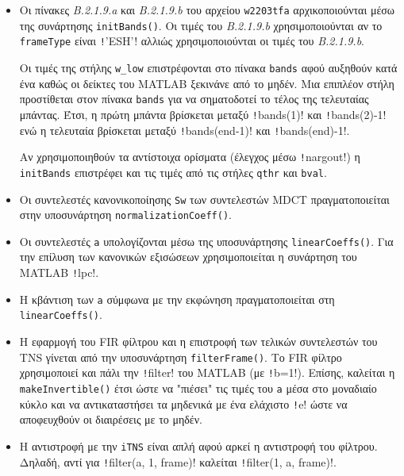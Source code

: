 \begin{itemize}
\item\label{initBands} Οι πίνακες \textit{B.2.1.9.a} και \textit{B.2.1.9.b} του αρχείου \texttt{w2203tfa} αρχικοποιούνται μέσω της συνάρτησης \texttt{initBands()}.
Οι τιμές του \textit{B.2.1.9.b} χρησιμοποιούνται αν το \texttt{frameType} είναι \texttt!'ESH'! αλλιώς χρησιμοποιούνται οι τιμές του \textit{B.2.1.9.b}.

Οι τιμές της στήλης \texttt{w\_low} επιστρέφονται στο πίνακα \texttt{bands} αφού αυξηθούν κατά ένα καθώς οι δείκτες του MATLAB ξεκινάνε από το μηδέν.
Μια επιπλέον στήλη προστίθεται στον πίνακα \texttt{bands} για να σηματοδοτεί το τέλος της τελευταίας μπάντας.
Έτσι, η πρώτη μπάντα βρίσκεται μεταξύ \texttt!bands(1)! και \texttt!bands(2)-1! ενώ η τελευταία βρίσκεται μεταξύ \texttt!bands(end-1)! και \texttt!bands(end)-1!.

Αν χρησιμοποιηθούν τα αντίστοιχα ορίσματα (έλεγχος μέσω \texttt!nargout!) η \texttt{initBands} επιστρέφει και τις τιμές από τις στήλες \texttt{qthr} και \texttt{bval}.

\item Οι συντελεστές κανονικοποίησης \texttt{Sw} των συντελεστών MDCT πραγματοποιείται στην υποσυνάρτηση \texttt{normalizationCoeff()}.

\item Οι συντελεστές \texttt{a} υπολογίζονται μέσω της υποσυνάρτησης \texttt{linearCoeffs()}.
Για την επίλυση των κανονικών εξισώσεων χρησιμοποιείται η συνάρτηση του MATLAB \texttt!lpc!.

\item Η κβάντιση των \texttt{a} σύμφωνα με την εκφώνηση πραγματοποιείται στη \texttt{linearCoeffs()}.

\item Η εφαρμογή του FIR φίλτρου και η επιστροφή των τελικών συντελεστών του TNS γίνεται από την υποσυνάρτηση \texttt{filterFrame()}.
Το FIR φίλτρο χρησιμοποιεί και πάλι την \texttt!filter! του MATLAB (με \texttt!b=1!).
Επίσης, καλείται η \texttt{makeInvertible()} έτσι ώστε να "πιέσει" τις τιμές του \texttt{a} μέσα στο μοναδιαίο κύκλο και να αντικαταστήσει τα μηδενικά με ένα ελάχιστο \texttt!e! ώστε να αποφευχθούν οι διαιρέσεις με το μηδέν.

\item Η αντιστροφή με την \texttt{iTNS} είναι απλή αφού αρκεί η αντιστροφή του φίλτρου.
Δηλαδή, αντί για \texttt!filter(a, 1, frame)! καλείται \texttt!filter(1, a, frame)!.
\end{itemize}

